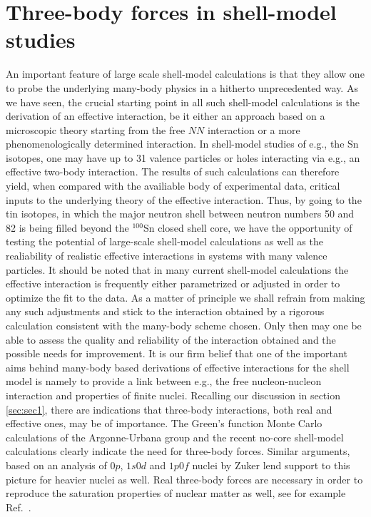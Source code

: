 \documentclass[twoside,12pt]{article}
\begin{document}
\section{Three-body forces in shell-model studies}\label{sec:sec7}

An important feature of large scale shell-model calculations
is that they allow one to probe the underlying many-body
physics in a hitherto unprecedented way.
As we have seen, the crucial starting point in all such shell-model 
calculations is
the derivation of an effective interaction, be it
either an approach based on a microscopic theory
starting from the free $NN$ interaction or a more 
phenomenologically determined interaction. 
In shell-model studies of e.g., the Sn isotopes, one may have
up to 31 valence particles or holes interacting via e.g.,
an effective two-body interaction. The results of such 
calculations can therefore yield, when compared with 
the availiable body of experimental data, critical
inputs to the underlying theory of the effective interaction.
Thus, by going to the
tin isotopes, in which the major neutron shell between neutron numbers 50 and
82 is being filled beyond the $^{100}$Sn closed shell core, we have the opportunity
of testing the potential of large-scale 
shell-model calculations as well as the realiability of
realistic effective interactions in systems with many valence particles. It should
be noted that in many current shell-model calculations the effective interaction
is frequently either parametrized or adjusted in order to optimize the fit to the
data. As a matter of principle we shall refrain from making any such
adjustments and stick to the interaction obtained by a 
rigorous calculation consistent with the many-body scheme chosen. 
Only then may one 
be able to assess the quality and reliability of the interaction 
obtained and the possible
needs for improvement. 
It is our firm belief that 
one of the important  aims  
behind many-body based derivations of effective
interactions for the shell model is namely
to provide a link between e.g., the free
nucleon-nucleon interaction and properties of
finite nuclei. 
Recalling our discussion in section \ref{sec:sec1}, there are indications that
three-body 
interactions, both real and effective ones, may be of
importance. The Green's function Monte Carlo calculations of the Argonne-Urbana
group \cite{bob1,bob2,bob3} and the recent no-core shell-model calculations
\cite{petr_erich2002,petr_erich2003} clearly indicate the need for
three-body forces. Similar arguments, based on an analysis of $0p$, $1s0d$ and $1p0f$
nuclei by Zuker \cite{zuker1} lend support to this picture for heavier nuclei as well.
Real three-body forces are necessary
in order to reproduce the saturation properties of nuclear matter as well, see for example
Ref.~\cite{apr98}.
\end{document}
